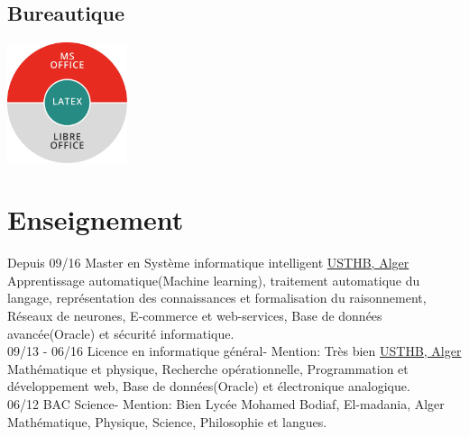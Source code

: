 \documentclass[]{friggeri-cv}
\begin{document}
\begin{aside}
  \section{Bureautique}
    \includegraphics[width=100pt]{img/bureautique.jpg}
    ~
\end{aside}
\vspace{0.42cm}
\section{Enseignement}
\begin{entrylist}
  \entry
    {Depuis 09/16}
    {Master en  Système informatique intelligent}
    {\href{http://www.usthb.dz/IMG/pdf/Master-SII.pdf}{USTHB, Alger}}
    {Apprentissage automatique(Machine learning), traitement automatique du langage, représentation des connaissances et formalisation du raisonnement, Réseaux de neurones, E-commerce et web-services, Base de données avancée(Oracle) et sécurité informatique.\\}
  \entry
    {09/13 - 06/16}
    {Licence en informatique général- Mention: Très bien}
    {\href{http://www.usthb.dz/spip.php?article47}{USTHB, Alger}}
    {Mathématique et physique, Recherche opérationnelle, Programmation et développement web,  Base de données(Oracle) et électronique analogique.\\}
  \entry
    {06/12}
    {BAC Science- Mention: Bien}
    {Lycée Mohamed Bodiaf, El-madania, Alger}
    {Mathématique, Physique, Science, Philosophie et langues.}
\end{entrylist}

\vspace{1.5cm}
\end{document}
